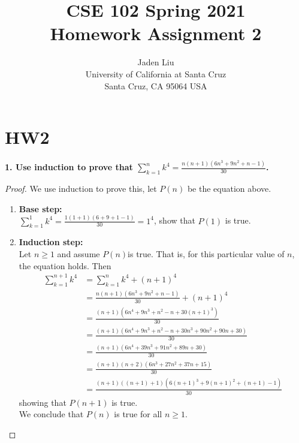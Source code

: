 \documentclass[12pt]{article}
\begin{document}
\title{ CSE 102 Spring 2021\\
	Homework Assignment 2}

\author{Jaden Liu \\ 
University of California at Santa Cruz\\
Santa Cruz, CA 95064 USA }

\maketitle


\section{HW2} 

\textbf{1. Use induction to prove that $\sum_{k=1}^{n}k^4=\frac{n(n+1)(6n^3+9n^2+n-1)}{30}$. }\\

\begin{proof}
	We use induction to prove this, let $P(n)$ be the equation above.
\begin{enumerate}
	\item \textbf{Base step:}\\
	$\sum_{k=1}^{1}k^4=\frac{1(1+1)(6+9+1-1)}{30}=1^4$, show that $P(1)$ is true.
	\item \textbf{Induction step:}\\
	Let $n\ge1$ and assume $P(n)$is true. That is, for this particular value of $n$, the
	equation holds. Then
	\begin{align*}
		\sum_{k=1}^{n+1}k^4&=\sum_{k=1}^{n}k^4+(n+1)^4\\
		&=\frac{n(n+1)(6n^3+9n^2+n-1)}{30}+(n+1)^4\\	
		&=\frac{(n+1)(6n^4+9n^3+n^2-n+30(n+1)^3)}{30}\\
		&=\frac{(n+1)(6n^4+9n^3+n^2-n+30n^3+90n^2+90n+30)}{30}\\
		&=\frac{(n+1)(6n^4+39n^3+91n^2+89n+30)}{30}\\
		&=\frac{(n+1)(n+2)(6n^3+27n^2+37n+15)}{30}\\
		&=\frac{(n+1)((n+1)+1)(6(n+1)^3+9(n+1)^2+(n+1)-1)}{30}
	\end{align*}
\qquad showing that $P(n+1)$ is true.\\
We conclude that $P(n)$ is true for all $n\ge1$.
\end{enumerate}
\end{proof}
\end{document}
